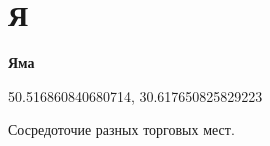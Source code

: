 \chapter*{Я}

\textbf{Яма}

50.516860840680714, 30.617650825829223

Сосредоточие разных торговых мест.\\

\medskip

